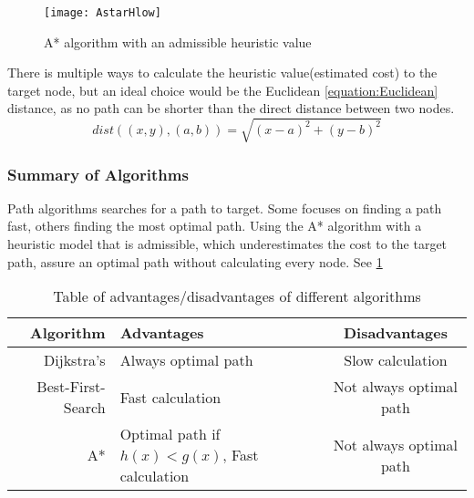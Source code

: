   \begin{figure}[ht!]
    \centering
    \texttt{[image: AstarHlow]}
    \caption{A* algorithm with an admissible heuristic value}
    \label{astar}
  \end{figure}

  There is multiple ways to calculate the heuristic value(estimated cost) to the target node, but an ideal choice would be the Euclidean \ref{equation:Euclidean}  distance, as no path can be shorter than the direct distance between two nodes.
  \begin{equation} \label{equation:Euclidean}
    dist((x, y), (a, b)) = \sqrt{(x - a)^2 + (y - b)^2}
  \end{equation}

  \subsubsection{Summary of Algorithms}

  Path algorithms searches for a path to target. Some focuses on finding a path fast, others finding the most optimal path. Using the A* algorithm with a heuristic model that is admissible, which underestimates the cost to the target path, assure an optimal path without calculating every node. See \cref{tbl:scheme}
  
  \begin{table}[ht!]
    \centering
    \begin{tabular}{|r|l|c|}
      \hline
      \textbf{Algorithm} & \textbf{Advantages} & \textbf{Disadvantages} \\
      \hline
      Dijkstra's & Always optimal path & Slow calculation \\
      Best-First-Search & Fast calculation & Not always optimal path \\
      A* & Optimal path if $h(x)<g(x)$, Fast calculation & Not always optimal path \\
      \hline
    \end{tabular}
    \caption{Table of advantages/disadvantages of different algorithms}
    \label{tbl:scheme}
  \end{table}